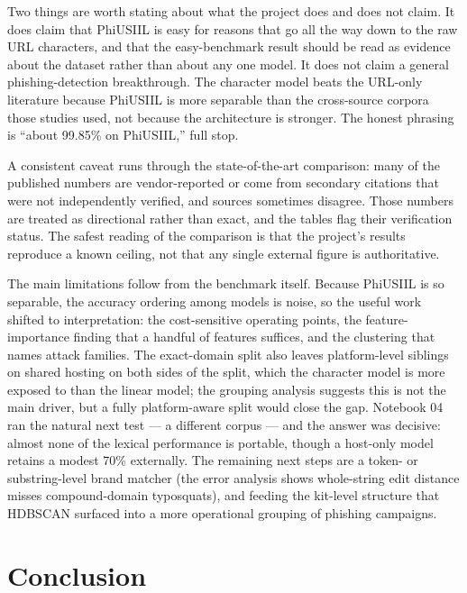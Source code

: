 \documentclass[stu,12pt,floatsintext]{apa7}
\begin{document}
Two things are worth stating about what the project does and does not
claim. It does claim that PhiUSIIL is easy for reasons that go all the way
down to the raw URL characters, and that the easy-benchmark result should
be read as evidence about the dataset rather than about any one model. It
does not claim a general phishing-detection breakthrough. The character
model beats the URL-only literature because PhiUSIIL is more separable than
the cross-source corpora those studies used, not because the architecture
is stronger. The honest phrasing is ``about 99.85\% on PhiUSIIL,'' full
stop.

A consistent caveat runs through the state-of-the-art comparison: many of
the published numbers are vendor-reported or come from secondary citations
that were not independently verified, and sources sometimes disagree.
Those numbers are treated as directional rather than exact, and the tables
flag their verification status. The safest reading of the comparison is
that the project's results reproduce a known ceiling, not that any single
external figure is authoritative.

The main limitations follow from the benchmark itself. Because PhiUSIIL is
so separable, the accuracy ordering among models is noise, so the useful
work shifted to interpretation: the cost-sensitive operating points, the
feature-importance finding that a handful of features suffices, and the
clustering that names attack families. The exact-domain split also leaves
platform-level siblings on shared hosting on both sides of the split,
which the character model is more exposed to than the linear model; the
grouping analysis suggests this is not the main driver, but a fully
platform-aware split would close the gap. Notebook 04 ran the natural
next test --- a different corpus --- and the answer was decisive: almost
none of the lexical performance is portable, though a host-only model
retains a modest 70\% externally. The remaining next steps are a token-
or substring-level brand matcher (the error analysis shows whole-string
edit distance misses compound-domain typosquats), and feeding the
kit-level structure that HDBSCAN surfaced into a more operational
grouping of phishing campaigns.

\section{Conclusion}
\end{document}
